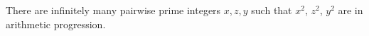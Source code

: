 There are infinitely many pairwise prime integers $x, z, y$ such that $x^2$, $z^2$, $y^2$ are in arithmetic progression.
